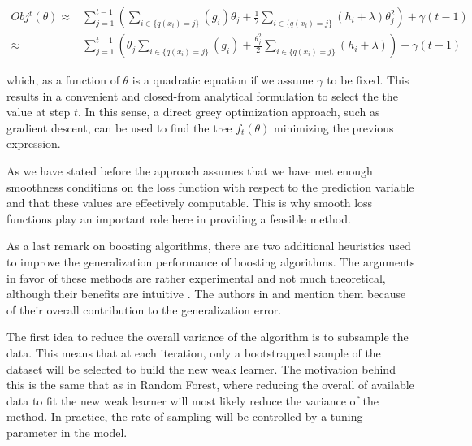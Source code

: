 \documentclass{article}%
\theoremstyle{definition}
\begin{document}
\begin{equation} \label{eq:gb-objSteps1}
\begin{split}
Obj^t(\theta) \approx  & \sum_{j=1}^{t-1} \left(  \sum_{i \in \{q(x_i)=j\}} (g_i )\theta_{j} + \frac{1}{2} \sum_{i \in \{q(x_i)=j\}} (h_i + \lambda ) \theta_{j}^2  \right) + \gamma ({t-1}) \\
\approx  & \sum_{j=1}^{t-1} \left(  \theta_{j}\sum_{i \in \{q(x_i)=j\}} (g_i ) + \frac{\theta_{j}^2}{2} \sum_{i \in \{q(x_i)=j\}} (h_i + \lambda )  \right) + \gamma ({t-1}) 
\end{split}
\end{equation}

which, as a function of $\theta$ is a quadratic equation if we assume $\gamma$ to be fixed. This results in a convenient and closed-from analytical formulation to select the the value at step $t$. In this sense, a direct greey optimization approach, such as gradient descent, can be used to find the tree $f_t(\theta)$ minimizing the previous expression.

As we have stated before the approach assumes that we have met enough smoothness conditions on the loss function with respect to the prediction variable 
and that these values are effectively computable. This is why smooth loss functions play an important role here in providing a feasible method. 




As a last remark on boosting algorithms, there are two additional heuristics used to improve the generalization performance of boosting algorithms. The arguments in favor of these methods are rather experimental and not much theoretical, although their benefits are intuitive . The authors in \cite{hastie-elemstatslearn} and \cite{bishop - patternRecognition} mention them because of their overall contribution to the generalization error.

The first idea to reduce the overall variance of the algorithm is to subsample the data. This means that at each iteration, only a bootstrapped sample of the dataset will be selected to build the new weak learner. The motivation behind this is the same that as in Random Forest, where reducing the overall of available data to fit the new weak learner will most likely reduce the variance of the method. In practice, the rate of sampling will be controlled by a tuning parameter in the model.
\end{document}
